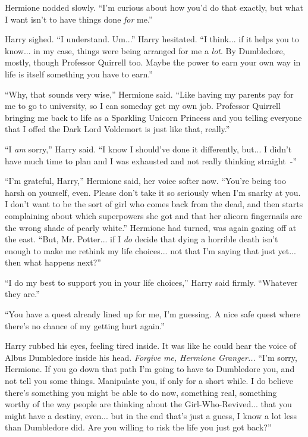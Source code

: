 Hermione nodded slowly. ``I'm curious about how you'd do that exactly, but what I want isn't to have things done \emph{for} me.''

Harry sighed. ``I understand. Um...'' Harry hesitated. ``I think... if it helps you to know... in my case, things were being arranged for me a \emph{lot}. By Dumbledore, mostly, though Professor Quirrell too. Maybe the power to earn your own way in life is itself something you have to earn.''

``Why, that sounds very wise,'' Hermione said. ``Like having my parents pay for me to go to university, so I can someday get my own job. Professor Quirrell bringing me back to life as a Sparkling Unicorn Princess and you telling everyone that I offed the Dark Lord Voldemort is just like that, really.''

``I \emph{am} sorry,'' Harry said. ``I know I should've done it differently, but... I didn't have much time to plan and I was exhausted and not really thinking straight~-''

``I'm grateful, Harry,'' Hermione said, her voice softer now. ``You're being too harsh on yourself, even. Please don't take it so seriously when I'm snarky at you. I don't want to be the sort of girl who comes back from the dead, and then starts complaining about which superpowers she got and that her alicorn fingernails are the wrong shade of pearly white.'' Hermione had turned, was again gazing off at the east. ``But, Mr. Potter... if I \emph{do} decide that dying a horrible death isn't enough to make me rethink my life choices... not that I'm saying that just yet... then what happens next?''

``I do my best to support you in your life choices,'' Harry said firmly. ``Whatever they are.''

``You have a quest already lined up for me, I'm guessing. A nice safe quest where there's no chance of my getting hurt again.''

Harry rubbed his eyes, feeling tired inside. It was like he could hear the voice of Albus Dumbledore inside his head. \emph{Forgive me, Hermione Granger...} ``I'm sorry, Hermione. If you go down that path I'm going to have to Dumbledore you, and not tell you some things. Manipulate you, if only for a short while. I do believe there's something you might be able to do now, something real, something worthy of the way people are thinking about the Girl-Who-Revived... that you might have a destiny, even... but in the end that's just a guess, I know a lot less than Dumbledore did. Are you willing to risk the life you just got back?''

